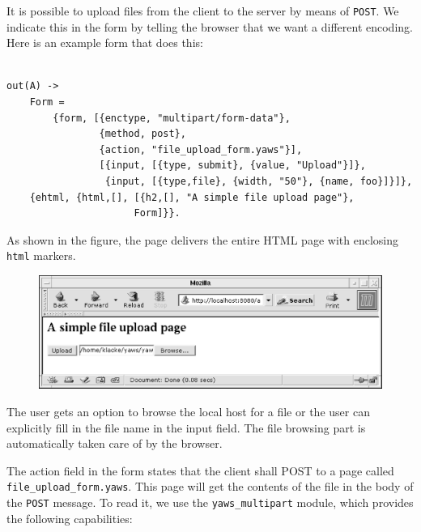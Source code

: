 \documentclass[11pt,oneside,english]{book}
\begin{document}
It is possible to upload files from the client to the server by means
of \verb+POST+. We indicate this in the form by telling the browser
that we want a different encoding. Here is an example form that does
this:
\begin{verbatim}

out(A) ->
    Form =
        {form, [{enctype, "multipart/form-data"},
                {method, post},
                {action, "file_upload_form.yaws"}],
                [{input, [{type, submit}, {value, "Upload"}]},
                 {input, [{type,file}, {width, "50"}, {name, foo}]}]},
    {ehtml, {html,[], [{h2,[], "A simple file upload page"},
                      Form]}}.

\end{verbatim}

As shown in the figure, the page delivers the entire HTML page with
enclosing \verb+html+ markers.


\begin{figure}[h]
\begin{center}

 \includegraphics[scale=0.6] {b}

\end{center}
\end{figure}

The user gets an option to browse the local host for a file
or the user can explicitly fill in the file name in the input
field. The file browsing part is automatically taken care of by the
browser.

The action field in the form states that the client shall POST to a
page called \verb+file_upload_form.yaws+. This page will get the
contents of the file in the body of the \verb+POST+ message. To read
it, we use the \verb+yaws_multipart+ module, which provides the
following capabilities:
\end{document}
